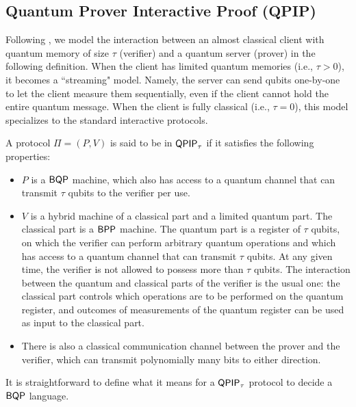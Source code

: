 \subsection{Quantum Prover Interactive Proof (QPIP)} 
\label{sec:qpip_def}

Following \cite{FOCS:Mahadev18a}, we model the interaction between an almost classical client with quantum memory of size $\tau$ (verifier) and a quantum server (prover) in the following definition.
When the client has limited quantum memories (i.e., $\tau > 0$), it becomes a ``streaming" model. Namely, the server can send qubits one-by-one to let the client measure them sequentially, even if the client cannot hold the entire quantum message.
When the client is fully classical (i.e., $\tau = 0$), this model specializes to the standard interactive protocols.

\begin{definition}
    A protocol $\Pi=(P, V)$ is said to be in $\operatorname{\mathsf{QPIP}}_\tau$ if it satisfies the following properties:
    \begin{itemize}
        \item $P$ is a $\operatorname{\mathsf{BQP}}$ machine, which also has access to a quantum channel that can transmit $\tau$ qubits to the verifier per use.
        \item $V$ is a hybrid machine of a classical part and a limited quantum part. The classical part is a $\operatorname{\mathsf{BPP}}$ machine. The quantum part is a register of $\tau$ qubits, on which the verifier can perform arbitrary quantum operations and which has access to a quantum channel that can transmit $\tau$ qubits. At any given time, the verifier is not allowed to possess more than $\tau$ qubits. The interaction between the quantum and classical parts of the verifier is the usual one: the classical part controls which operations are to be performed on the quantum register, and outcomes of measurements of the quantum register can be used as input to the classical part.
        \item There is also a classical communication channel between the prover and the verifier, which can transmit polynomially many bits to either direction.
    \end{itemize}
\end{definition}

It is straightforward to define what it means for a $\operatorname{\mathsf{QPIP}}_\tau$ protocol to decide a $\operatorname{\mathsf{BQP}}$ language.

